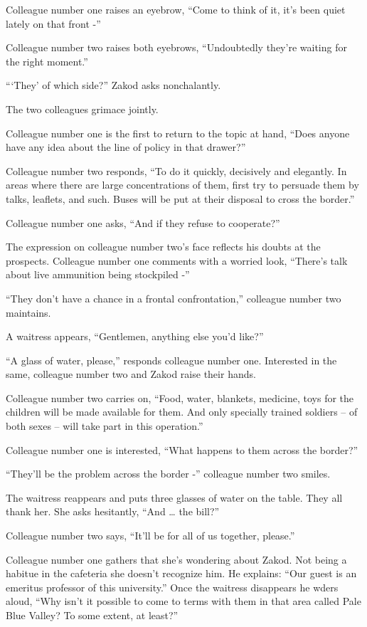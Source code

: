 \documentclass[twoside,11pt]{book}
\begin{document}
Colleague number one raises an eyebrow, ``Come to think of it, it's been quiet lately on that front
-''

Colleague number two raises both eyebrows, ``Undoubtedly they're waiting for the
right moment.''

``{`They'} of which side?'' Zakod asks nonchalantly.

The two colleagues grimace jointly.

Colleague number one is the first to return to the topic at hand, ``Does anyone have any idea about the
line of policy in that drawer?''

Colleague number two responds, ``To do it quickly, decisively and elegantly. In areas where there are large
concentrations of them, first try to persuade them by talks, leaflets, and such. Buses will be put at their disposal to
cross the border.''

Colleague number one asks, ``And if they refuse to cooperate?''

The expression on colleague number two's face reflects his doubts at the prospects. Colleague number one comments with a
worried look, ``There's talk about live ammunition being stockpiled -''

``They don't have a chance in a frontal confrontation,'' colleague number two maintains.

A waitress appears, ``Gentlemen, anything else you'd like?''

``A glass of water, please,'' responds colleague number one. Interested in the same, colleague
number two and Zakod raise their hands.

Colleague number two carries on, ``Food, water, blankets, medicine, toys for the children will be made
available for them.  And only specially trained soldiers -- of both sexes -- will take part in this
operation.''

Colleague number one is interested, ``What happens to them across the border?''

``They'll be the problem across the border -'' colleague number two smiles.

The waitress reappears and puts three glasses of water on the table. They all thank her. She asks hesitantly,
``And {\dots} the bill?''

Colleague number two says, ``It'll be for all of us together, please.''

Colleague number one gathers that she's wondering about Zakod. Not being a habitue in the cafeteria she doesn't
recognize him. He explains: ``Our guest is an emeritus professor of this university.'' Once
the waitress disappears he wders aloud, ``Why isn't it possible to come to terms with them in that area
called Pale Blue Valley? To some extent, at least?''
\end{document}
